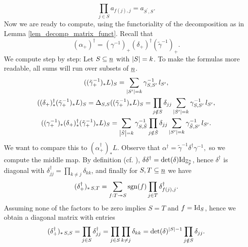 \begin{rem}
\begin{displaymath}
        \prod_{j \in S}a_{f(j),j} = a_{S^\prime, S}.
    \end{displaymath}
    Now we are ready to compute, using the functoriality of the decomposition as
    in Lemma \ref{lem_decomp_matrix_funct}.
    Recall that 
    \begin{displaymath}
      (\alpha_+)^\dagger = %
        (\gamma^{-1})_+ (\delta_+)^\dagger (\tilde\gamma^{-1})_+.
    \end{displaymath}
    We compute step by step: Let $S \subseteq \underline{n}$ with $\left\vert S\right\vert = k$. To
    make the formulas more readable, all sums will run over subsets of
    $\underline{n}$.
    \begin{gather*}
      ( (\tilde\gamma_+^{-1})_* L )_S = \sum_{\abs{S^\prime} = k } %
        \gamma^{-1}_{S,S^\prime} \, l_{S^\prime}, \\
      ( (\delta_+)^\dagger_* (\tilde\gamma_+^{-1})_* L )_S = %
        \Delta_{S,S} ( (\tilde\gamma_+^{-1})_* L )_S =%
        \prod_{j \notin S} \delta_{jj} \sum_{ \abs{S^\prime} = k } %
        \gamma^{-1}_{S,S^\prime}\, l_{S^\prime},\\
      ( (\gamma_+^{-1})_* (\delta_+)^\dagger_* (\tilde\gamma_+^{-1})_* L )_S = %
        \sum_{\abs{\tilde S} = k} \gamma^{-1}_{S,\tilde S} %
        \prod_{j \notin \tilde S} \delta_{jj} \sum_{ \abs{S^\prime} = k } %
        \gamma^{-1}_{\tilde S,S^\prime}\, l_{S^\prime}.
    \end{gather*}
    We want to compare this to $( \alpha^\dagger_+ )_* L$. Observe that
    $ \alpha^\dagger = \tilde \gamma^{-1} \delta^\dagger \gamma^{-1},$ %
    so we compute the middle map. By definition (cf. \cite[Definition
    3.7]{carlsson2011higher}), $\delta \delta^\dagger = \det(\delta)
    \mathrm{Id}_{\mathbb{Z}_p^n}$, hence $\delta^\dagger$ is diagonal with $\delta^\dagger_{jj}
    = \prod_{k \neq j} \delta_{kk}$, and finally for $S,T \subseteq \underline{n}$ we
    have%
    \begin{displaymath}
      (\delta^\dagger_+)_{*\, S,T} = \sum_{f:T \onto S} %
        \sgn(f) \prod_{j \in T} \delta^\dagger_{f(j),j}.
    \end{displaymath}
    Assuming none of the factors to be zero implies $S = T$ and $f = \mathrm{Id}_S$,
    hence we obtain a diagonal matrix with entries%
    \begin{displaymath}
      (\delta^\dagger_+)_{*\,S,S} = \prod_{j \in S} \delta^\dagger_{jj} = %
        \prod_{j \in S} \prod_{k \neq j} \delta_{kk} = %
        \det(\delta)^{\abs{S}-1} \prod_{j \notin S} \delta_{jj}.
    \end{displaymath}

\end{rem}
